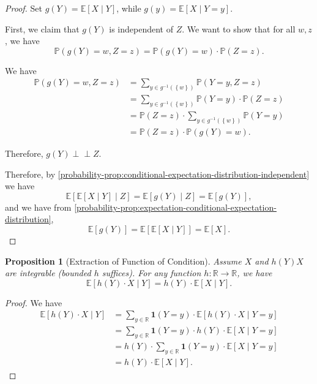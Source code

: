 \documentclass[11pt]{article}
\numberwithin{equation}{section}
\newtheorem{proposition}[theorem]{Proposition}
\theoremstyle{definition}
\theoremstyle{remark}
\newcommand{\pqty}[1]{\left(#1\right)}
\newcommand{\bqty}[1]{\left[#1\right]}
\newcommand{\Bqty}[1]{\left\{#1\right\}}
\newcommand{\functiondomain}[3]{#1:#2\to #3}
\newcommand{\RR}{\mathbb R}
\newcommand{\inverse}{^{-1}}
\newcommand{\indicator}{\mathbf 1}
\newcommand{\Prob}{\mathbb P}
\newcommand{\Expt}{\mathbb E}
\newcommand{\indp}{\mathrel{\perp\!\!\!\perp}}
\newcommand{\Conditional}[2]{#1\mid #2}
\begin{document}
\begin{proof}\label{probability-proof-037}
    Set \(g\pqty{Y} = \Expt\bqty{\Conditional{X}{Y}}\), while \(g\pqty{y} = \Expt\bqty{\Conditional{X}{Y = y}}\).

    First, we claim that \(g\pqty{Y}\) is independent of \(Z\). We want to show that for all \(w, z\), we have
    \[
        \Prob\pqty{g\pqty{Y} = w, Z = z} = \Prob\pqty{g\pqty{Y} = w} \cdot \Prob\pqty{Z = z}.
    \]

    We have
    \begin{align*}
        \Prob\pqty{g\pqty{Y} = w, Z = z} &= \sum_{y \in g\inverse\pqty{\Bqty{w}}} \Prob\pqty{Y = y, Z = z} \\
        &= \sum_{y \in g\inverse\pqty{\Bqty{w}}} \Prob\pqty{Y = y} \cdot \Prob\pqty{Z = z} \\
        &= \Prob\pqty{Z = z} \cdot \sum_{y \in g\inverse\pqty{\Bqty{w}}} \Prob\pqty{Y = y} \\
        &= \Prob\pqty{Z = z} \cdot \Prob\pqty{g\pqty{Y} = w}.
    \end{align*}

    Therefore, \(g\pqty{Y} \indp Z\).

    Therefore, by \autoref{probability-prop:conditional-expectation-distribution-independent} we have
    \[
        \Expt\bqty{\Conditional{\Expt\bqty{\Conditional{X}{Y}}}{Z}} = \Expt\bqty{\Conditional{g\pqty{Y}}{Z}} = \Expt\bqty{g\pqty{Y}},
    \]
    and we have from \autoref{probability-prop:expectation-conditional-expectation-distribution},
    \[
        \Expt\bqty{g\pqty{Y}} = \Expt\bqty{\Expt\bqty{\Conditional{X}{Y}}} = \Expt\bqty{X}.
    \]
\end{proof}

\begin{proposition}[Extraction of Function of Condition]\label{probability-proposition-022}
    \label{probability-prop:extraction-function-condition}%
Assume \(X\) and \(h(Y)X\) are integrable (bounded \(h\) suffices).
    For any function \(\functiondomain{h}{\RR}{\RR}\), we have
    \[
        \Expt\bqty{\Conditional{h\pqty{Y} \cdot X}{Y}} = h\pqty{Y} \cdot \Expt\bqty{\Conditional{X}{Y}}.
    \]
\end{proposition}

\begin{proof}\label{probability-proof-038}
    We have
    \begin{align*}
        \Expt\bqty{\Conditional{h\pqty{Y} \cdot X}{Y}} &= \sum_{y \in \RR} \indicator\pqty{Y = y} \cdot \Expt\bqty{\Conditional{h\pqty{Y} \cdot X}{Y = y}} \\
        &= \sum_{y \in \RR} \indicator\pqty{Y = y} \cdot h\pqty{Y} \cdot \Expt\bqty{\Conditional{X}{Y = y}} \\
        &= h\pqty{Y} \cdot \sum_{y \in \RR} \indicator\pqty{Y = y} \cdot \Expt\bqty{\Conditional{X}{Y = y}} \\
        &= h\pqty{Y} \cdot \Expt\bqty{\Conditional{X}{Y}}.
    \end{align*}
\end{proof}
\end{document}
